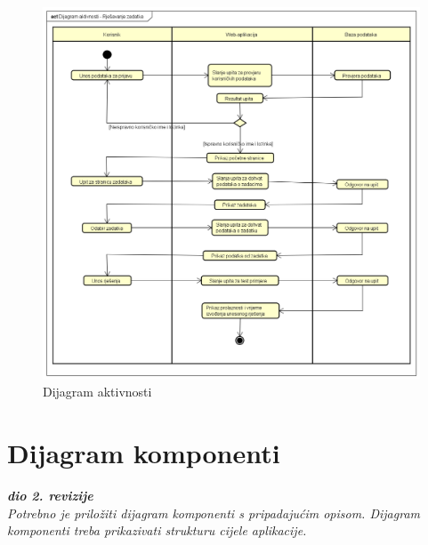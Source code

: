 			\begin{figure}[H]
				\includegraphics[width=\textwidth]{slike/DijagramAktivnosti.png} %
				\caption{Dijagram aktivnosti}
				\label{fig:DijagramAktivnosti} %
			\end{figure}
						
			\eject
		\section{Dijagram komponenti}
		
			\textbf{\textit{dio 2. revizije}}\\
		
			 \textit{Potrebno je priložiti dijagram komponenti s pripadajućim opisom. Dijagram komponenti treba prikazivati strukturu cijele aplikacije.}